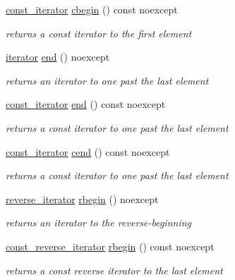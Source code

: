 \begin{DoxyCompactItemize}
\hyperlink{classnlohmann_1_1basic__json_a41a70cf9993951836d129bb1c2b3126a}{const\+\_\+iterator} \hyperlink{classnlohmann_1_1basic__json_ad865d6c291b237ae508d5cb2146b5877}{cbegin} () const noexcept
\begin{DoxyCompactList}\small\item\em returns a const iterator to the first element \end{DoxyCompactList}\item 
\hyperlink{classnlohmann_1_1basic__json_a099316232c76c034030a38faa6e34dca}{iterator} \hyperlink{classnlohmann_1_1basic__json_a13e032a02a7fd8a93fdddc2fcbc4763c}{end} () noexcept
\begin{DoxyCompactList}\small\item\em returns an iterator to one past the last element \end{DoxyCompactList}\item 
\hyperlink{classnlohmann_1_1basic__json_a41a70cf9993951836d129bb1c2b3126a}{const\+\_\+iterator} \hyperlink{classnlohmann_1_1basic__json_a1c15707055088cd5436ae91db72cbe67}{end} () const noexcept
\begin{DoxyCompactList}\small\item\em returns a const iterator to one past the last element \end{DoxyCompactList}\item 
\hyperlink{classnlohmann_1_1basic__json_a41a70cf9993951836d129bb1c2b3126a}{const\+\_\+iterator} \hyperlink{classnlohmann_1_1basic__json_a8dba7b7d2f38e6b0c614030aa43983f6}{cend} () const noexcept
\begin{DoxyCompactList}\small\item\em returns a const iterator to one past the last element \end{DoxyCompactList}\item 
\hyperlink{classnlohmann_1_1basic__json_ac223d5560c2b05a208c88de67376c5f2}{reverse\+\_\+iterator} \hyperlink{classnlohmann_1_1basic__json_a1ef93e2006dbe52667294f5ef38b0b10}{rbegin} () noexcept
\begin{DoxyCompactList}\small\item\em returns an iterator to the reverse-\/beginning \end{DoxyCompactList}\item 
\hyperlink{classnlohmann_1_1basic__json_a72be3c24bfa24f0993d6c11af03e7404}{const\+\_\+reverse\+\_\+iterator} \hyperlink{classnlohmann_1_1basic__json_a515e7618392317dbf4b72d3e18bf2ab2}{rbegin} () const noexcept
\begin{DoxyCompactList}\small\item\em returns a const reverse iterator to the last element \end{DoxyCompactList}\item 

\end{DoxyCompactItemize}
